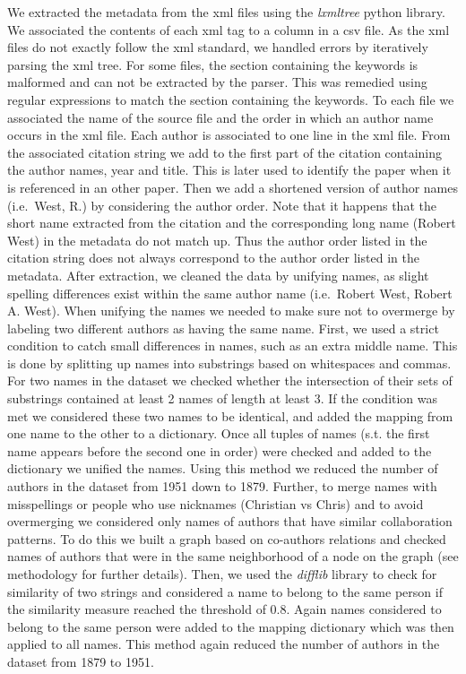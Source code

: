 \documentclass[article,twocolumn]{IEEEtran}
\begin{document}
We extracted the metadata from the xml files using the \emph{lxmltree}
python library. We associated the contents of each xml tag to a column
in a csv file. As the xml files do not exactly follow the xml standard,
we handled errors by iteratively parsing the xml tree. For some files,
the section containing the keywords is malformed and can not be
extracted by the parser. This was remedied using regular expressions to
match the section containing the keywords. To each file we associated
the name of the source file and the order in which an author name occurs
in the xml file. Each author is associated to one line in the xml file.
From the associated citation string we add to the first part of the
citation containing the author names, year and title. This is later used
to identify the paper when it is referenced in an other paper. Then we
add a shortened version of author names (i.e.~West, R.) by considering
the author order. Note that it happens that the short name extracted
from the citation and the corresponding long name (Robert West) in the
metadata do not match up. Thus the author order listed in the citation
string does not always correspond to the author order listed in the
metadata. After extraction, we cleaned the data by unifying names, as
slight spelling differences exist within the same author name
(i.e.~Robert West, Robert A. West). When unifying the names we needed to
make sure not to overmerge by labeling two different authors as having
the same name. First, we used a strict condition to catch small
differences in names, such as an extra middle name. This is done by
splitting up names into substrings based on whitespaces and commas. For
two names in the dataset we checked whether the intersection of their
sets of substrings contained at least 2 names of length at least 3. If
the condition was met we considered these two names to be identical, and
added the mapping from one name to the other to a dictionary. Once all
tuples of names (s.t. the first name appears before the second one in
order) were checked and added to the dictionary we unified the names.
Using this method we reduced the number of authors in the dataset from
1951 down to 1879. Further, to merge names with misspellings or people
who use nicknames (Christian vs Chris) and to avoid overmerging we
considered only names of authors that have similar collaboration
patterns. To do this we built a graph based on co-authors relations and
checked names of authors that were in the same neighborhood of a node on
the graph (see methodology for further details). Then, we used the
\emph{difflib} library to check for similarity of two strings and
considered a name to belong to the same person if the similarity measure
reached the threshold of 0.8. Again names considered to belong to the
same person were added to the mapping dictionary which was then applied
to all names. This method again reduced the number of authors in the
dataset from 1879 to 1951.
\end{document}
